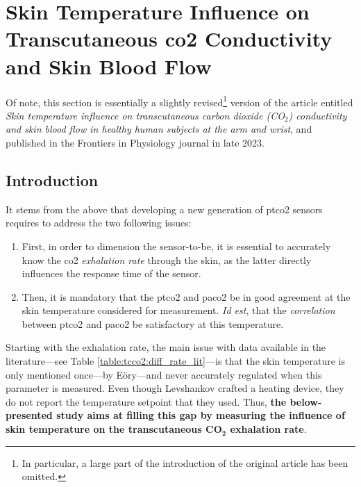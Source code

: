 \section[Skin Temp. Influence on Tc. \texorpdfstring{\gls{co2}}{CO2} Conductivity]{Skin Temperature Influence on Transcutaneous \texorpdfstring{\gls{co2}}{CO2} Conductivity and Skin Blood Flow}\label{sect:tcco2:frontiers_article}

Of note, this section is essentially a slightly revised\footnote{In particular, a large part of the introduction of the original article has been omitted.} version of the article entitled \textit{Skin temperature influence on transcutaneous carbon dioxide (CO$_\textit{2}$) conductivity and skin blood flow in healthy human subjects at the arm and wrist}, and published in the Frontiers in Physiology journal in late 2023\cite{dervieux2023rate}.

\subsection{Introduction}\label{sect:tcco2:frontiers_intro}

It stems from the above that developing a new generation of \gls{ptco2} sensors requires to address the two following issues:
\begin{enumerate}
	\item First, in order to dimension the sensor-to-be, it is essential to accurately know the \gls{co2} \emph{exhalation rate} through the skin, as the latter directly influences the response time of the sensor.
	\item Then, it is mandatory that the \gls{ptco2} and \gls{paco2} be in good agreement at the skin temperature considered for measurement. \textit{Id est}, that the \emph{correlation} between \gls{ptco2} and \gls{paco2} be satisfactory at this temperature.
\end{enumerate}

Starting with the exhalation rate, the main issue with data available in the literature---see Table \ref{table:tcco2:diff_rate_lit}---is that the skin temperature is only mentioned once---by Eöry\cite{eory1984}---and never accurately regulated when this parameter is measured\cite{fitzgerald1957}. Even though Levshankov \etal{}\cite{levshankov1983} crafted a heating device, they do not report the temperature setpoint that they used. Thus, \textbf{the below-presented study aims at filling this gap by measuring the influence of skin temperature on the transcutaneous $\mathbf{CO_2}$ exhalation rate}.

